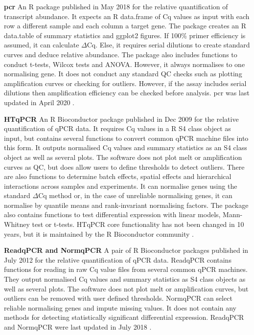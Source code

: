 \documentclass{SBCbookchapter}
\begin{document}
\textbf{pcr} An R package published in May 2018 for the relative quantification of transcript abundance. It expects an R data.frame of Cq values as input with each row a different sample and each column a target gene. The package creates an R data.table of summary statistics and ggplot2 figures. If 100\% primer efficiency is assumed, it can calculate $\Delta$Cq. Else, it requires serial dilutions to create standard curves and deduce relative abundance. The package also includes functions to conduct t-tests, Wilcox tests  and ANOVA. However, it always normalises to one normalising gene. It does not conduct any standard QC checks such as plotting amplification curves or checking for outliers. However, if the assay includes serial dilutions then amplification efficiency can be checked before analysis. pcr was last updated in April 2020 \cite{Ahmed2018}.

\textbf{HTqPCR} An R Bioconductor package published in Dec 2009 for the relative quantification of qPCR data. It requires Cq values in a R S4 class object as input, but contains several functions to convert common qPCR machine files into this form. It outputs normalised Cq values and summary statistics as an S4 class object as well as several plots. The software does not plot melt or amplification curves as QC, but does allow users to define thresholds to detect outliers. There are also functions to determine batch effects, spatial effects and hierarchical interactions across samples and experiments. It can normalise genes using the standard $\Delta$Cq method or, in the case of unreliable normalising genes, it can normalise by quantile means and rank-invariant normalising factors. The package also contains functions to test differential expression with linear models, Mann-Whitney test or t-tests. HTqPCR core functionality has not been changed in 10 years, but it is maintained by the R Bioconductor community \cite{Dvinge2009}.

\textbf{ReadqPCR and NormqPCR} A pair of R Bioconductor packages published in July 2012 for the relative quantification of qPCR data. ReadqPCR contains functions for reading in raw Cq value files from several common qPCR machines. They output normalised Cq values and summary statistics as S4 class objects as well as several plots. The software does not plot melt or amplification curves, but outliers can be removed with user defined thresholds. NormqPCR can select reliable normalising genes and impute missing values. It does not contain any methods for detecting statistically significant differential expression. ReadqPCR and NormqPCR were last updated in July 2018 \cite{Perkins2012}.
\end{document}
